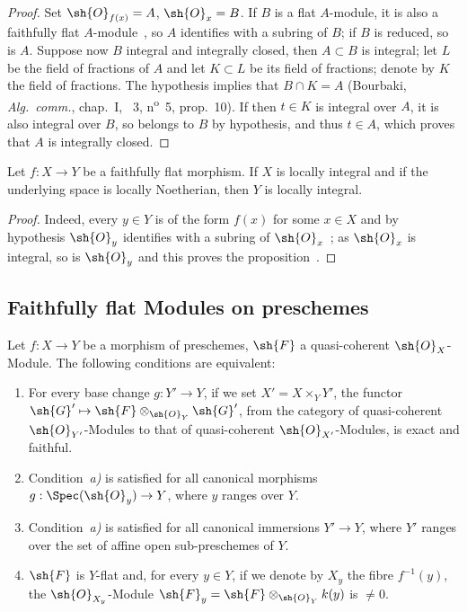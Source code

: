 \begin{proof}
Set $\sh{O}_{f(x)}=A$, $\sh{O}_x=B$.
If $B$ is a flat $A$-module, it is also a faithfully flat $A$-module~, so $A$ identifies with a subring of $B$; if $B$ is reduced, so is $A$.
Suppose now $B$ integral and integrally closed, then $A\subset B$ is integral; let $L$ be the field of fractions of $A$ and let $K\subset L$ be its field of fractions; denote by $K$ the field of fractions.
The hypothesis implies that $B\cap K=A$ (Bourbaki, \emph{Alg.~comm.}, chap.~I, \textsection~3, n\textsuperscript{o}~5, prop.~10).
If then $t\in K$ is integral over $A$, it is also integral over $B$, so belongs to $B$ by hypothesis, and thus $t\in A$, which proves that $A$ is integrally closed.
\end{proof}

\begin{proposition}[2.1.14]
\label{IV.2.1.14}
Let $f:X\to Y$ be a faithfully flat morphism. If $X$ is locally integral and if the underlying space is locally Noetherian, then $Y$ is locally integral.
\end{proposition}

\begin{proof}
Indeed, every $y\in Y$ is of the form $f(x)$ for some $x\in X$ and by hypothesis $\sh{O}_y$ identifies with a subring of $\sh{O}_x$~; as $\sh{O}_x$ is integral, so is $\sh{O}_y$ and this proves the proposition~.
\end{proof}

\subsection{Faithfully flat Modules on preschemes}
\label{subsection:IV.2.2}

\begin{proposition}[2.2.1]
\label{IV.2.2.1}
Let $f:X\to Y$ be a morphism of preschemes, $\sh{F}$ a quasi-coherent $\sh{O}_X$-Module. The following conditions are equivalent:
\begin{enumerate}[label=\emph{\alph*)}]
  \item For every base change $g:Y'\to Y$, if we set $X'=X\times_Y Y'$, the functor $\sh{G}'\mapsto\sh{F}\otimes_{\sh{O}_Y}\sh{G}'$, from the category of quasi-coherent $\sh{O}_{Y'}$-Modules to that of quasi-coherent $\sh{O}_{X'}$-Modules, is exact and faithful.
  \item[\emph{a$'$)}] Condition~\emph{a)} is satisfied for all canonical morphisms $g:\Spec(\sh{O}_y)\to Y$, where $y$ ranges over $Y$.
  \item[\emph{a$''$)}] Condition~\emph{a)} is satisfied for all canonical immersions $Y'\to Y$, where $Y'$ ranges over the set of affine open sub-preschemes of $Y$.
  \item $\sh{F}$ is $Y$-flat and, for every $y\in Y$, if we denote by $X_y$ the fibre $f^{-1}(y)$, the $\sh{O}_{X_y}$-Module $\sh{F}_y=\sh{F}\otimes_{\sh{O}_Y}k(y)$ is $\neq 0$.
\end{enumerate}
\end{proposition}


